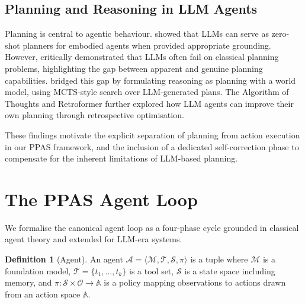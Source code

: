 \documentclass[review,authoryear]{elsarticle}
\theoremstyle{definition}
\newtheorem{definition}{Definition}
\begin{document}
\subsection{Planning and Reasoning in LLM Agents}

Planning is central to agentic behaviour. \citet{huang2024understanding} showed that LLMs can serve as zero-shot planners for embodied agents when provided appropriate grounding. However, \citet{valmeekam2024planning} critically demonstrated that LLMs often fail on classical planning problems, highlighting the gap between apparent and genuine planning capabilities. \citet{hao2023reasoning} bridged this gap by formulating reasoning as planning with a world model, using MCTS-style search over LLM-generated plans. The Algorithm of Thoughts \citep{sel2023algorithm} and Retroformer \citep{yao2023retroformer} further explored how LLM agents can improve their own planning through retrospective optimisation.

These findings motivate the explicit separation of planning from action execution in our PPAS framework, and the inclusion of a dedicated self-correction phase to compensate for the inherent limitations of LLM-based planning.

\section{The PPAS Agent Loop}\label{sec:ppas}

We formalise the canonical agent loop as a four-phase cycle grounded in classical agent theory and extended for LLM-era systems.

\begin{definition}[Agent]
An agent $\mathcal{A} = \langle \mathcal{M}, \mathcal{T}, \mathcal{S}, \pi \rangle$ is a tuple where $\mathcal{M}$ is a foundation model, $\mathcal{T} = \{t_1, \ldots, t_k\}$ is a tool set, $\mathcal{S}$ is a state space including memory, and $\pi: \mathcal{S} \times \mathcal{O} \rightarrow \mathbb{A}$ is a policy mapping observations to actions drawn from an action space $\mathbb{A}$.
\end{definition}
\end{document}
